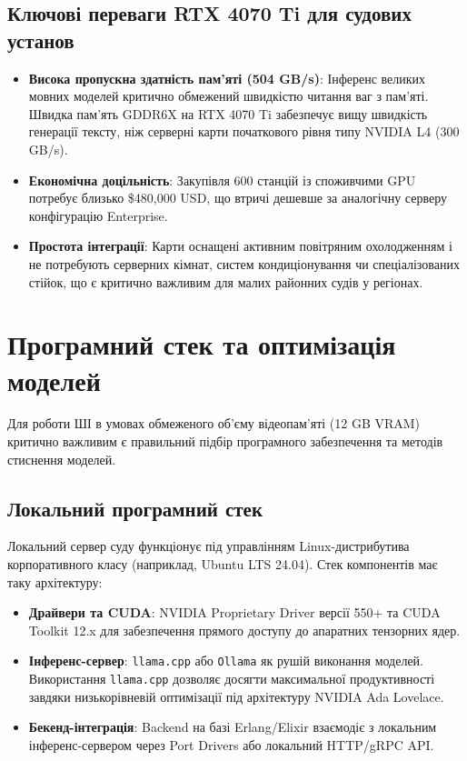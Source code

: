 \documentclass{article}
\begin{document}
\subsection{Ключові переваги RTX 4070 Ti для судових установ}
\begin{itemize}
\item \textbf{Висока пропускна здатність пам'яті (504 GB/s)}: Інференс великих мовних моделей критично обмежений швидкістю читання ваг з пам'яті. Швидка пам'ять GDDR6X на RTX 4070 Ti забезпечує вищу швидкість генерації тексту, ніж серверні карти початкового рівня типу NVIDIA L4 (300 GB/s).
\item \textbf{Економічна доцільність}: Закупівля 600 станцій із споживчими GPU потребує близько \$480,000 USD, що втричі дешевше за аналогічну серверу конфігурацію Enterprise.
\item \textbf{Простота інтеграції}: Карти оснащені активним повітряним охолодженням і не потребують серверних кімнат, систем кондиціонування чи спеціалізованих стійок, що є критично важливим для малих районних судів у регіонах.
\end{itemize}

\section{Програмний стек та оптимізація моделей}
Для роботи ШІ в умовах обмеженого об'єму відеопам'яті (12 GB VRAM) критично важливим є правильний підбір програмного забезпечення та методів стиснення моделей.

\subsection{Локальний програмний стек}
Локальний сервер суду функціонує під управлінням Linux-дистрибутива корпоративного класу (наприклад, Ubuntu LTS 24.04). Стек компонентів має таку архітектуру:
\begin{itemize}
\item \textbf{Драйвери та CUDA}: NVIDIA Proprietary Driver версії 550+ та CUDA Toolkit 12.x для забезпечення прямого доступу до апаратних тензорних ядер.
\item \textbf{Інференс-сервер}: \texttt{llama.cpp} або \texttt{Ollama} як рушій виконання моделей. Використання \texttt{llama.cpp} дозволяє досягти максимальної продуктивності завдяки низькорівневій оптимізації під архітектуру NVIDIA Ada Lovelace.
\item \textbf{Бекенд-інтеграція}: Backend на базі Erlang/Elixir взаємодіє з локальним інференс-сервером через Port Drivers або локальний HTTP/gRPC API.
\end{itemize}
\end{document}
